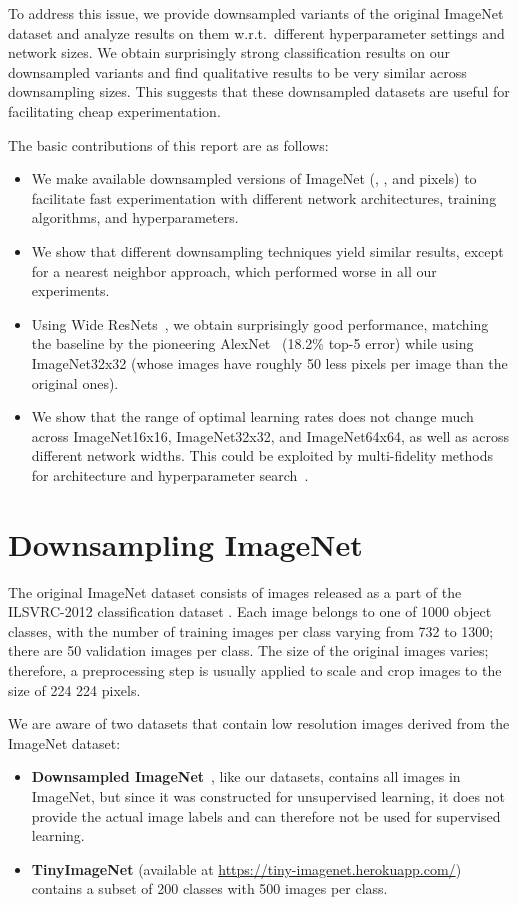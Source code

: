 \documentclass{article} \usepackage{iclr2017_conference,times}
\begin{document}
To address this issue, we provide downsampled variants of the original ImageNet dataset and analyze results on them w.r.t.\ different hyperparameter settings and network sizes. We obtain surprisingly strong classification results on our downsampled variants and find qualitative results to be very similar across downsampling sizes. This suggests that these downsampled datasets are useful for facilitating cheap experimentation.

The basic contributions of this report are as follows:
\begin{itemize}
\item We make available downsampled versions of ImageNet (, , and  pixels) to facilitate fast experimentation with different network architectures, training algorithms, and hyperparameters.
\item We show that different downsampling techniques yield similar results, except for a nearest neighbor approach, which performed worse in all our experiments.
\item Using Wide ResNets~\citep{zagoruyko2016wide}, we obtain surprisingly good performance, matching the baseline by the pioneering AlexNet~\citep{krizhevsky2012imagenet} (18.2\% top-5 error) while using ImageNet32x32 (whose images have roughly 50 less pixels per image than the original ones). 
\item We show that the range of optimal learning rates does not change much across ImageNet16x16, ImageNet32x32, and ImageNet64x64, as well as across different network widths. This could be exploited by multi-fidelity methods for architecture and hyperparameter search~\citep{li2016hyperband,klein2016fast}.
\end{itemize}

\section{Downsampling ImageNet}\label{sec:downsampling}

The original ImageNet dataset consists of images released as a part of the ILSVRC-2012 classification dataset \citep{krizhevsky2012imagenet,ILSVRC15}. Each image belongs to one of 1000 object classes, with the number of training images per class varying from 732 to 1300; there are 50 validation images per class. The size of the original images varies; therefore, a preprocessing step is usually applied to scale and crop images to the size of 224  224 pixels.

We are aware of two datasets that contain low resolution images derived from the ImageNet dataset: 
\begin{itemize}
\item \textbf{Downsampled ImageNet}~\citep{oord2016pixel}, like our datasets, contains all images in ImageNet, but since it was constructed for unsupervised learning, it does not provide the actual image labels and can therefore not be used for supervised learning.
\item \textbf{TinyImageNet} (available at \url{https://tiny-imagenet.herokuapp.com/})
contains a subset of 200 classes with 500 images per class.
\end{itemize}
\end{document}
